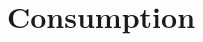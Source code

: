 \documentclass[conference]{IEEEtran}
\begin{document}
\section{Consumption}


%
%
%
%
%
%
\end{document}
